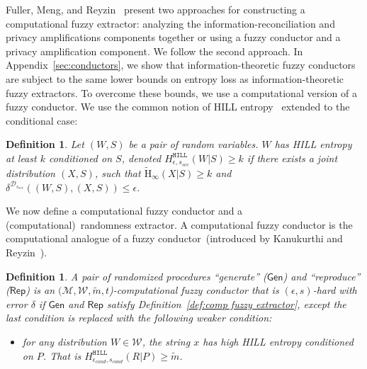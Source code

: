 \documentclass[11pt]{article}
\newcommand{\apref}[1]{\mbox{Appendix~\ref{#1}}}
\newcommand{\defref}[1]{\mbox{Definition~\ref{#1}}}
\newcommand{\class}[1]{{\ensuremath{\mathsf{#1}}}}
\newcommand{\gen}{\ensuremath{\class{Gen}}\xspace}
\newcommand{\rep}{\ensuremath{\class{Rep}}\xspace}
\newcommand{\hill}{\ensuremath{\mathtt{HILL}}\xspace}
\newcommand{\Hav}{\tilde{\mathrm{H}}_\infty}
\newtheorem{definition}[theorem]{Definition}
\begin{document}
Fuller, Meng, and Reyzin~\cite{fuller2013computational} present two approaches for constructing a computational fuzzy extractor: analyzing the information-reconciliation and privacy amplifications components together or using a fuzzy conductor and a privacy amplification component.  We follow the second approach.
In \apref{sec:conductors}, we show that information-theoretic fuzzy conductors are subject to the same lower bounds on entropy loss as information-theoretic  fuzzy extractors.  To overcome these bounds, we use a computational version of a fuzzy conductor.
We use the common notion of HILL entropy~\cite{DBLP:journals/siamcomp/HastadILL99} extended to the conditional case:
\begin{definition}
\label{def:hill ent}
Let $(W, S)$ be a pair of random variables.  $W$ has
\emph{HILL entropy} at least $k$ conditioned on $S$,
denoted $H^{\hill}_{\epsilon, s_{sec}}(W|S)\geq k$ if there exists a joint distribution $(X, S)$, such that $\Hav(X|S)\geq k$ and $\delta^{\mathcal{D}_{s_{sec}}} ((W, S),(X,S))\leq \epsilon$.
\end{definition} 
We now define a computational fuzzy conductor and a (computational)~randomness extractor.  A computational fuzzy conductor is the computational analogue of a fuzzy conductor~(introduced by Kanukurthi and Reyzin~\cite{KanukurthiR09}).
\begin{definition}
\label{def:comp fuzzy cond}
A pair of randomized procedures ``generate'' ($\gen$) and ``reproduce'' ($\rep$) is an $(\mathcal{M}, \mathcal{W}, \tilde{m}, t$)-computational fuzzy conductor that is $(\epsilon, s)$-hard with error $\delta$ if $\gen$ and $\rep$ satisfy \defref{def:comp fuzzy extractor}, except the last condition is replaced with the following weaker condition:
\begin{itemize}
\item for any distribution $W\in \mathcal{W}$, the string $x$ has high HILL entropy conditioned on $P$.  That is $H^{\hill}_{\epsilon_{cond}, s_{cond}}(R |P)\geq \tilde{m}$.
\end{itemize}
\end{definition}
\end{document}
